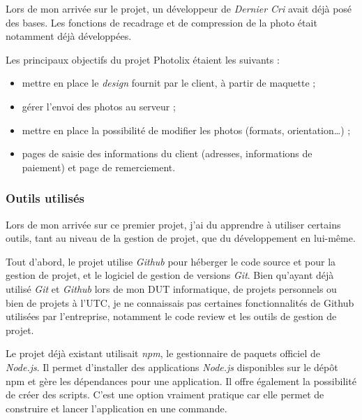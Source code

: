 \documentclass[12pt,a4paper]{article}
\providecommand{\tightlist}{%
  \setlength{\itemsep}{0pt}\setlength{\parskip}{0pt}}
\begin{document}
  \bigskip

  Lors de mon arrivée sur le projet, un développeur de \emph{Dernier Cri}
  avait déjà posé des bases. Les fonctions de recadrage et de compression
  de la photo était notamment déjà développées.

  \bigskip

  Les principaux objectifs du projet Photolix étaient les suivants :

  \begin{itemize}
  \tightlist
  \item
    mettre en place le \emph{design} fournit par le client, à partir de
    maquette ;
  \item
    gérer l'envoi des photos au serveur ;
  \item
    mettre en place la possibilité de modifier les photos (formats,
    orientation\ldots{}) ;
  \item
    pages de saisie des informations du client (adresses, informations de
    paiement) et page de remerciement.
  \end{itemize}

  \bigskip

  \subsubsection{Outils utilisés}\label{outils-utilisuxe9s}

  \bigskip

  Lors de mon arrivée sur ce premier projet, j'ai du apprendre à utiliser
  certains outils, tant au niveau de la gestion de projet, que du
  développement en lui-même.

  \bigskip

  Tout d'abord, le projet utilise \emph{Github} pour héberger le code
  source et pour la gestion de projet, et le logiciel de gestion de
  versions \emph{Git}. Bien qu'ayant déjà utilisé \emph{Git} et
  \emph{Github} lors de mon DUT informatique, de projets personnels ou
  bien de projets à l'UTC, je ne connaissais pas certaines fonctionnalités
  de Github utilisées par l'entreprise, notamment le code review et les
  outils de gestion de projet.

  \bigskip

  Le projet déjà existant utilisait \emph{npm}, le gestionnaire de paquets
  officiel de \emph{Node.js}. Il permet d'installer des applications
  \emph{Node.js} disponibles sur le dépôt npm et gère les dépendances pour
  une application. Il offre également la possibilité de créer des scripts.
  C'est une option vraiment pratique car elle permet de construire et
  lancer l'application en une commande.
\end{document}

